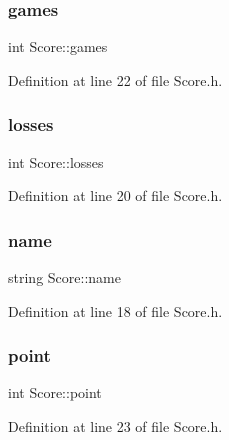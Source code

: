 \subsubsection{\texorpdfstring{games}{games}}
{\footnotesize\ttfamily int Score\+::games\hspace{0.3cm}{\ttfamily [protected]}}



Definition at line 22 of file Score.\+h.

\hypertarget{class_score_a571dfba97776842fd2558a77992cfe22}{}\label{class_score_a571dfba97776842fd2558a77992cfe22} 
\subsubsection{\texorpdfstring{losses}{losses}}
{\footnotesize\ttfamily int Score\+::losses\hspace{0.3cm}{\ttfamily [protected]}}



Definition at line 20 of file Score.\+h.

\hypertarget{class_score_a5344ecc1bc167a6fd99aec0fe6d04a60}{}\label{class_score_a5344ecc1bc167a6fd99aec0fe6d04a60} 
\subsubsection{\texorpdfstring{name}{name}}
{\footnotesize\ttfamily string Score\+::name\hspace{0.3cm}{\ttfamily [protected]}}



Definition at line 18 of file Score.\+h.

\hypertarget{class_score_ab43e949a772acc77bb555fb3d7ccbc65}{}\label{class_score_ab43e949a772acc77bb555fb3d7ccbc65} 
\subsubsection{\texorpdfstring{point}{point}}
{\footnotesize\ttfamily int Score\+::point\hspace{0.3cm}{\ttfamily [protected]}}



Definition at line 23 of file Score.\+h.

\hypertarget{class_score_a5bdcbfa7299aecece44b67a8150efc1d}{}\label{class_score_a5bdcbfa7299aecece44b67a8150efc1d} 
